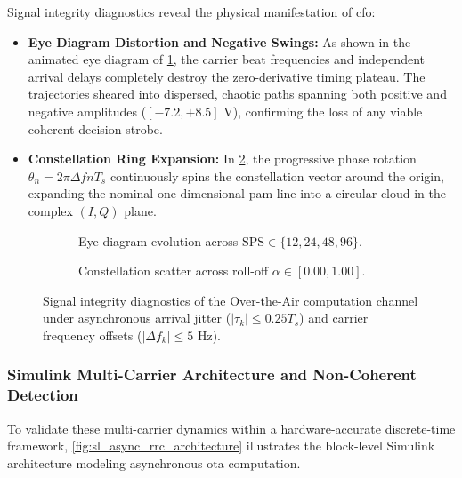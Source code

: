 \documentclass[Markos_Delaportas_1316.tex]{subfiles}
\begin{document}
Signal integrity diagnostics reveal the physical manifestation of \gls{cfo}:
\begin{itemize}[leftmargin=*]
    \item \textbf{Eye Diagram Distortion and Negative Swings:} As
        shown in the animated eye diagram
        of \cref{fig:ml_async_rrc_fc_eye}, the carrier beat
        frequencies and independent arrival delays
        completely destroy the zero-derivative timing plateau. The
        trajectories sheared into dispersed,
        chaotic paths spanning both positive and negative amplitudes
        ($[-7.2, +8.5]\text{ V}$), confirming
        the loss of any viable coherent decision strobe.
    \item \textbf{Constellation Ring Expansion:} In
        \cref{fig:ml_async_rrc_fc_const}, the progressive
        phase rotation $\theta_n = 2\pi \Delta f n T_s$ continuously
        spins the constellation vector
        around the origin, expanding the nominal one-dimensional
        \gls{pam} line into a circular cloud
        in the complex $(I, Q)$ plane.
\end{itemize}

\begin{figure}[htbp]
    \centering
    \begin{subfigure}{.48\linewidth}
        \caption{Eye diagram evolution across $\text{SPS} \in \{12,
        24, 48, 96\}$.}
        \label{fig:ml_async_rrc_fc_eye}
    \end{subfigure}%
    \hfill
    \begin{subfigure}{.48\linewidth}
        \caption{Constellation scatter across roll-off $\alpha \in
        [0.00, 1.00]$.}
        \label{fig:ml_async_rrc_fc_const}
    \end{subfigure}
    \caption{Signal integrity diagnostics of the Over-the-Air
        computation channel under
        asynchronous arrival jitter ($|\tau_k| \le 0.25 T_s$) and
        carrier frequency offsets
    ($|\Delta f_k| \le 5\text{ Hz}$).}
    \label{fig:async_diagnostics_combined}
\end{figure}

\subsubsection{Simulink Multi-Carrier Architecture and Non-Coherent Detection}
\label{subsubsec:simulink_async_pipeline}
To validate these multi-carrier dynamics within a hardware-accurate
discrete-time framework,
\cref{fig:sl_async_rrc_architecture} illustrates the block-level
Simulink architecture modeling
asynchronous \gls{ota} computation.
\end{document}
